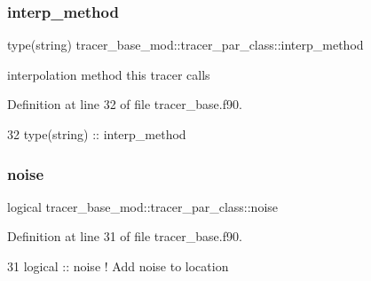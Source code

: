\subsubsection{\texorpdfstring{interp\+\_\+method}{interp\_method}}
{\footnotesize\ttfamily type(string) tracer\+\_\+base\+\_\+mod\+::tracer\+\_\+par\+\_\+class\+::interp\+\_\+method\hspace{0.3cm}{\ttfamily [private]}}



interpolation method this tracer calls 



Definition at line 32 of file tracer\+\_\+base.\+f90.


\begin{DoxyCode}
32         \textcolor{keywordtype}{type}(string) :: interp\_method
\end{DoxyCode}
\mbox{\label{structtracer__base__mod_1_1tracer__par__class_ae331d822841461c650cb0f3ebdf511b3}} 
\subsubsection{\texorpdfstring{noise}{noise}}
{\footnotesize\ttfamily logical tracer\+\_\+base\+\_\+mod\+::tracer\+\_\+par\+\_\+class\+::noise\hspace{0.3cm}{\ttfamily [private]}}



Definition at line 31 of file tracer\+\_\+base.\+f90.


\begin{DoxyCode}
31         \textcolor{keywordtype}{logical}    :: noise                 \textcolor{comment}{!  Add noise to location}
\end{DoxyCode}
\mbox{\label{structtracer__base__mod_1_1tracer__par__class_a58ad740d66f1c65d200ad7bd22fbcb77}} 
